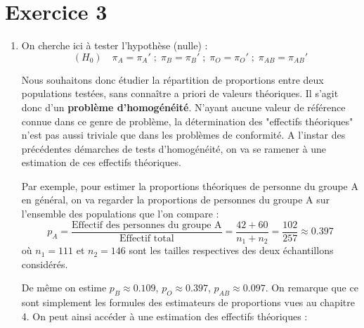 \documentclass[a4paper,oneside,12pt]{article}
\theoremstyle{plain}
\begin{document}
\section*{Exercice 3}

\begin{enumerate}
    \item[] On cherche ici à tester l'hypothèse (nulle) :
    $$(H_0) \quad \pi_A = \pi_A'\; ; \;\pi_B = \pi_B'\; ; \;\pi_O = \pi_O'\; ; \;\pi_{AB} = \pi_{AB}'$$

    Nous souhaitons donc étudier la répartition de proportions entre deux populations testées, sans connaître a priori de valeurs théoriques. Il s'agit donc d'un \textbf{problème d'homogénéité}. N'ayant aucune valeur de référence connue dans ce genre de problème, la détermination des "effectifs théoriques" n'est pas aussi triviale que dans les problèmes de conformité. A l'instar des précédentes démarches de tests d'homogénéité, on va se ramener à une estimation de ces effectifs théoriques.

    Par exemple, pour estimer la proportions théoriques de personne du groupe A en général, on va regarder la proportions de personnes du groupe A sur l'ensemble des populations que l'on compare :
    $$p_A = \frac{\mbox{Effectif des personnes du groupe A}}{\mbox{Effectif total}} =  \frac{42+60}{n_1 +n_2} = \frac{102}{257}\approx 0.397$$
    où $n_1 = 111$ et $n_2 = 146$ sont les tailles respectives des deux échantillons considérés.

    De même on estime $p_B \approx 0.109$, $p_O \approx 0.397$, $p_{AB} \approx 0.097$. On remarque que ce sont simplement les formules des estimateurs de proportions vues au chapitre 4. On peut ainsi accéder à une estimation des effectifs théoriques :


\end{enumerate}
\end{document}
